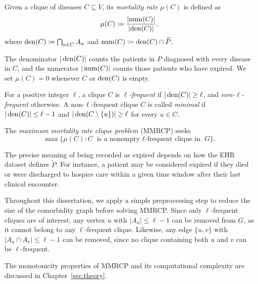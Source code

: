 \begin{definition}\label{def.MR}
Given a clique of diseases $C \subseteq V$, its \textit{mortality
rate} $\mu(C)$ is defined as
\begin{equation}
    \label{eq.MR}
    \mu(C) \coloneqq \frac{\left|\operatorname*{num}(C)\right|}{\left|\operatorname*{den}(C)\right|},
\end{equation}
where $\operatorname*{den}(C) \coloneqq \bigcap_{u \in C} A_u$ and
$\operatorname*{num}(C) \coloneqq \operatorname*{den}(C) \cap \widetilde{P}$.
\end{definition}

The denominator $|\operatorname*{den}(C)|$ counts the patients in $P$ diagnosed with
every disease in $C$, and the numerator $|\operatorname*{num}(C)|$ counts those
patients who have expired. We set $\mu(C) = 0$ whenever $C$ or
$\operatorname*{den}(C)$ is empty.

\begin{definition}\label{def.lfreq}
For a positive integer $\ell$, a clique $C$ is
\textit{$\ell$-frequent} if $|\operatorname*{den}(C)| \ge \ell$, and
\textit{non-$\ell$-frequent} otherwise. A non-$\ell$-frequent clique
$C$ is called \textit{minimal} if $|\operatorname*{den}(C)| \le \ell - 1$ and
$|\operatorname*{den}(C \setminus \{u\})| \ge \ell$ for every $u \in C$.
\end{definition}

The \textit{maximum mortality rate clique problem} (MMRCP) seeks
\begin{equation}
    \max\bigl\{\mu(C) : C \text{ is a nonempty $\ell$-frequent
        clique in } G\bigr\}.
    \label{eq.MMRCP}
\end{equation}

The precise meaning of being recorded as expired depends on how the EHR dataset defines $\widetilde{P}$. For instance, a patient may be considered
expired if they died or were discharged to hospice care within a given
time window after their last clinical encounter.

Throughout this dissertation, we apply a simple preprocessing step to
reduce the size of the comorbidity graph before solving MMRCP. Since
only $\ell$-frequent cliques are of interest, any vertex $u$ with
$|A_u| \le \ell - 1$ can be removed from $G$, as it cannot belong to
any $\ell$-frequent clique. Likewise, any edge $\{u,v\}$ with
$|A_u \cap A_v| \le \ell - 1$ can be removed, since no clique
containing both $u$ and $v$ can be $\ell$-frequent.

The monotonicity properties of MMRCP and its computational complexity
are discussed in Chapter~\ref{sec.theory}.






